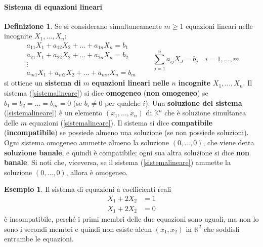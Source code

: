 \documentclass{article}
\theoremstyle{plain}
\theoremstyle{definition}
\newtheorem{defn}{Definizione}[section]
\newtheorem{exmp}{Esempio}[section]
\theoremstyle{remark}
\begin{document}
\vspace{10pt}

\paragraph{Sistema di equazioni lineari}
\begin{bxthm}
\begin{defn}
    Se si considerano simultaneamente \( m \geq 1 \) equazioni lineari nelle incognite \( X_1, \ldots, X_n \):
    \begin{equation}
        \begin{matrix}
            a_{11}X_1 + a_{12}X_2 + \ldots + a_{1n}X_n = b_1 \\
            a_{21}X_1 + a_{22}X_2 + \ldots + a_{2n}X_n = b_2 \\
            \vdots \\
            a_{m1}X_1 + a_{m2}X_2 + \ldots + a_{mn}X_n = b_m
        \end{matrix}\quad\quad \sum_{j=1}^{n}a_{ij}X_J=b_j\quad i=1,\ldots,m \label{sistemalineare}
    \end{equation}
    si ottiene un \textbf{sistema di} \( m \) \textbf{equazioni lineari nelle} $n$ \textbf{incognite} \( X_1, \ldots, X_n \). 
    Il sistema (\ref{sistemalineare}) si dice \textbf{omogeneo} (\textbf{non omogeneo}) se \( b_1 = b_2 = \ldots = b_m = 0 \) (se \( b_i \neq 0 \) per qualche \( i \)).
    Una \textbf{soluzione del sistema} (\ref{sistemalineare}) è un elemento \( (x_1, \ldots, x_n) \) di \( \mathbb{K}^n \) che è soluzione simultanea delle \( m \) equazioni (\ref{sistemalineare}). 
    Il sistema si dice \textbf{compatibile} (\textbf{incompatibile}) se possiede almeno una soluzione (se non possiede soluzioni). 
    Ogni sistema omogeneo ammette almeno la soluzione \( (0, \ldots, 0) \), che viene detta \textbf{soluzione banale}, e quindi è compatibile; 
    ogni sua altra soluzione si dice \textbf{non banale}.
    Si noti che, viceversa, se il sistema (\ref{sistemalineare}) ammette la soluzione \( (0, \ldots, 0) \), allora è omogeneo.
\end{defn}
\end{bxthm}

\vspace{10pt}

\begin{exmp}
    Il sistema di equazioni a coefficienti reali
    \[
        \begin{aligned}
            X_1 + 2X_2 &= 1 \\
            X_1 + 2X_2 &= 0
        \end{aligned}
    \]
    è incompatibile, perché i primi membri delle due equazioni sono uguali, ma non lo sono i secondi membri e quindi non esiste alcun \( (x_1, x_2) \) in \( \mathbb{R}^2 \) che soddisfi entrambe le equazioni.
\end{exmp}
\end{document}

